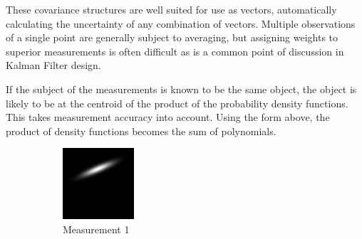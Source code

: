 \documentclass{article}
\newcounter{subsubsubsection}[subsubsection]
\begin{document}
        These covariance structures are well suited for use as vectors, automatically calculating the uncertainty of any combination of vectors. 
        Multiple observations of a single point are generally subject to averaging, but assigning weights to superior measurements is often difficult as is a common point of discussion in Kalman Filter design.
        
        If the subject of the measurements is known to be the same object, the object is likely to be at the centroid of the product of the probability density functions.  This takes measurement accuracy into account.
        Using the form above, the product of density functions becomes the sum of polynomials.
        \begin{figure}
        \centering
        \begin{subfigure}{.3\textwidth}
          \centering
          \includegraphics[width=.8\linewidth]{images/GaussianLine1.png}
          \caption{Measurement 1}
          \label{fig:uncProdsub1}
        \end{subfigure}%
        \begin{subfigure}{.3\textwidth}
          \centering

\end{subfigure}
\end{figure}
\end{document}
